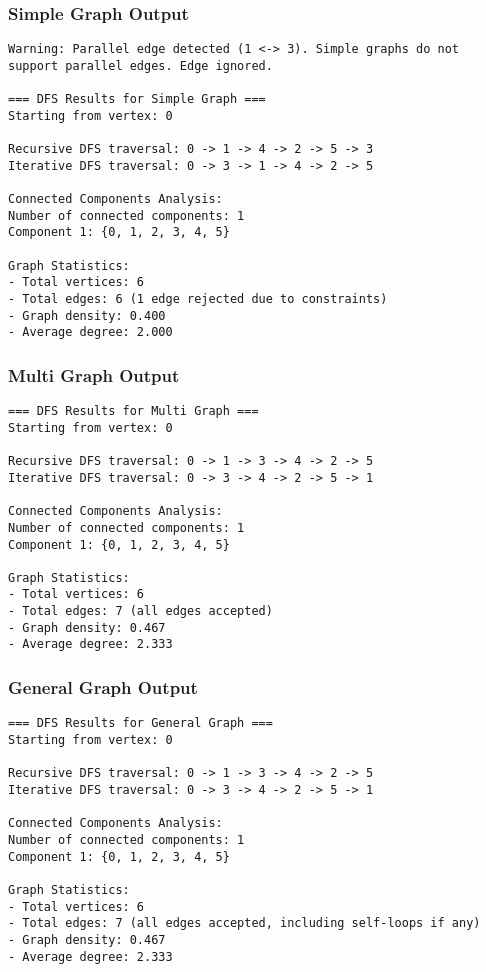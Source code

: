 \documentclass[12pt]{article}
\begin{document}
\subsubsection*{Simple Graph Output}
\begin{verbatim}
Warning: Parallel edge detected (1 <-> 3). Simple graphs do not support parallel edges. Edge ignored.

=== DFS Results for Simple Graph ===
Starting from vertex: 0

Recursive DFS traversal: 0 -> 1 -> 4 -> 2 -> 5 -> 3
Iterative DFS traversal: 0 -> 3 -> 1 -> 4 -> 2 -> 5

Connected Components Analysis:
Number of connected components: 1
Component 1: {0, 1, 2, 3, 4, 5}

Graph Statistics:
- Total vertices: 6
- Total edges: 6 (1 edge rejected due to constraints)
- Graph density: 0.400
- Average degree: 2.000
\end{verbatim}

\subsubsection*{Multi Graph Output}
\begin{verbatim}
=== DFS Results for Multi Graph ===
Starting from vertex: 0

Recursive DFS traversal: 0 -> 1 -> 3 -> 4 -> 2 -> 5
Iterative DFS traversal: 0 -> 3 -> 4 -> 2 -> 5 -> 1

Connected Components Analysis:
Number of connected components: 1
Component 1: {0, 1, 2, 3, 4, 5}

Graph Statistics:
- Total vertices: 6
- Total edges: 7 (all edges accepted)
- Graph density: 0.467
- Average degree: 2.333
\end{verbatim}

\subsubsection*{General Graph Output}
\begin{verbatim}
=== DFS Results for General Graph ===
Starting from vertex: 0

Recursive DFS traversal: 0 -> 1 -> 3 -> 4 -> 2 -> 5
Iterative DFS traversal: 0 -> 3 -> 4 -> 2 -> 5 -> 1

Connected Components Analysis:
Number of connected components: 1
Component 1: {0, 1, 2, 3, 4, 5}

Graph Statistics:
- Total vertices: 6
- Total edges: 7 (all edges accepted, including self-loops if any)
- Graph density: 0.467
- Average degree: 2.333
\end{verbatim}
\end{document}
